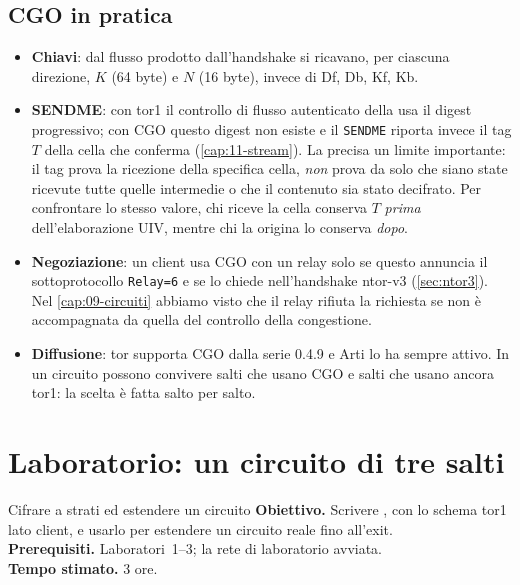 \subsection{CGO in pratica}

\begin{itemize}
  \item \textbf{Chiavi}: dal flusso prodotto dall'handshake si ricavano, per ciascuna direzione, $K$ (64 byte) e $N$ (16 byte), invece di Df, Db, Kf, Kb.
  \item \textbf{SENDME}: con tor1 il controllo di flusso autenticato della  usa il digest progressivo; con CGO questo digest non esiste e il \texttt{SENDME} riporta invece il tag $T$ della cella che conferma (\cref{cap:11-stream}). La  precisa un limite importante: il tag prova la ricezione della specifica cella, \emph{non} prova da solo che siano state ricevute tutte quelle intermedie o che il contenuto sia stato decifrato. Per confrontare lo stesso valore, chi riceve la cella conserva $T$ \emph{prima} dell'elaborazione UIV, mentre chi la origina lo conserva \emph{dopo}.
  \item \textbf{Negoziazione}: un client usa CGO con un relay solo se questo annuncia il sottoprotocollo \texttt{Relay=6} e se lo chiede nell'handshake ntor-v3 (\cref{sec:ntor3}). Nel \cref{cap:09-circuiti} abbiamo visto che il relay rifiuta la richiesta se non è accompagnata da quella del controllo della congestione.
  \item \textbf{Diffusione}: tor supporta CGO dalla serie 0.4.9 e Arti lo ha sempre attivo. In un circuito possono convivere salti che usano CGO e salti che usano ancora tor1: la scelta è fatta salto per salto.
\end{itemize}

\section{Laboratorio: un circuito di tre salti}\label{sec:lab-cifratura}

\begin{laboratorio}[4]{Cifrare a strati ed estendere un circuito}
\textbf{Obiettivo.} Scrivere , con lo schema tor1 lato client, e usarlo per estendere un circuito reale fino all'exit.\\
\textbf{Prerequisiti.} Laboratori~1--3; la rete di laboratorio avviata.\\
\textbf{Tempo stimato.} 3 ore.
\end{laboratorio}


